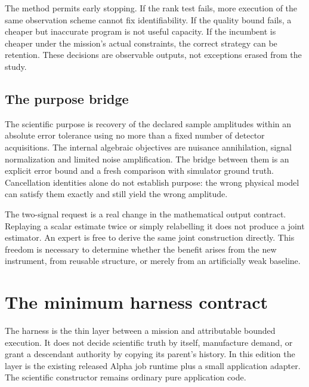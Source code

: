 \documentclass[11pt]{article}
\begin{document}
The method permits early stopping. If the rank test fails, more execution of the same observation scheme cannot fix identifiability. If the quality bound fails, a cheaper but inaccurate program is not useful capacity. If the incumbent is cheaper under the mission's actual constraints, the correct strategy can be retention. These decisions are observable outputs, not exceptions erased from the study.

\subsection{The purpose bridge}

The scientific purpose is recovery of the declared sample amplitudes within an absolute error tolerance using no more than a fixed number of detector acquisitions. The internal algebraic objectives are nuisance annihilation, signal normalization and limited noise amplification. The bridge between them is an explicit error bound and a fresh comparison with simulator ground truth. Cancellation identities alone do not establish purpose: the wrong physical model can satisfy them exactly and still yield the wrong amplitude.

The two-signal request is a real change in the mathematical output contract. Replaying a scalar estimate twice or simply relabelling it does not produce a joint estimator. An expert is free to derive the same joint construction directly. This freedom is necessary to determine whether the benefit arises from the new instrument, from reusable structure, or merely from an artificially weak baseline.



\section{The minimum harness contract}
\label{sec:harness}

The harness is the thin layer between a mission and attributable bounded execution. It does not decide scientific truth by itself, manufacture demand, or grant a descendant authority by copying its parent's history. In this edition the layer is the existing released Alpha job runtime plus a small application adapter. The scientific constructor remains ordinary pure application code.
\end{document}

